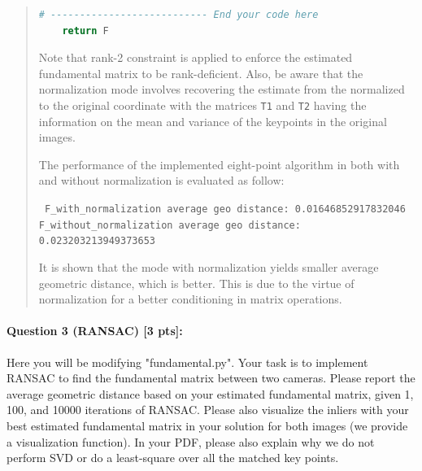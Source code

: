 \documentclass[11pt]{article}
\begin{document}
\begin{quote}
\begin{lstlisting}[language=Python, basicstyle=\scriptsize]
    # --------------------------- End your code here
    return F
\end{lstlisting}

Note that rank-2 constraint is applied to enforce the estimated fundamental matrix to be rank-deficient. Also, be aware that the normalization mode involves recovering the estimate from the normalized to the original coordinate with the matrices \texttt{T1} and \texttt{T2} having the information on the mean and variance of the keypoints in the original images.

The performance of the implemented eight-point algorithm in both with and without normalization is evaluated as follow:

{\tt
F\_with\_normalization average geo distance: 0.01646852917832046 \\
F\_without\_normalization average geo distance: 0.023203213949373653
}

It is shown that the mode with normalization yields smaller average geometric distance, which is better. This is due to the virtue of normalization for a better conditioning in matrix operations.

\end{quote}

\paragraph{Question 3 (RANSAC) [3 pts]:} Here you will be modifying "fundamental.py". Your task is to implement RANSAC to find the fundamental matrix between two cameras. Please report the average geometric distance based on your estimated fundamental matrix, given 1, 100, and 10000 iterations of RANSAC. Please also visualize the inliers with your best estimated fundamental matrix in your solution for both images (we provide a visualization function). In your PDF, please also explain why we do not perform SVD or do a least-square over all the matched key points. 
\end{document}
